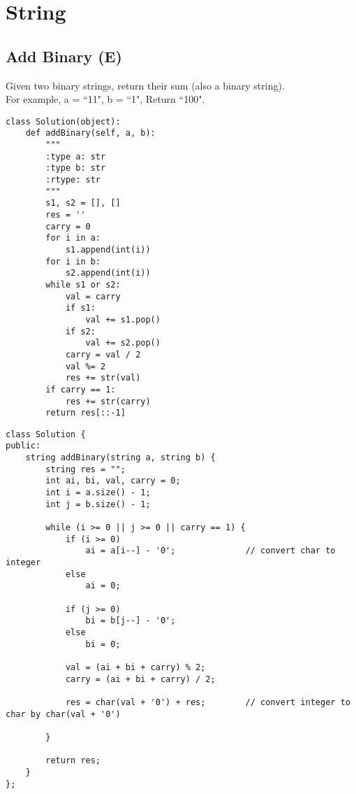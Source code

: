 \chapter{String}


\section{Add Binary (E)}
Given two binary strings, return their sum (also a binary string). \\

For example, a = ``11", b = ``1", Return ``100". \\ 

\begin{lstlisting}
class Solution(object):
    def addBinary(self, a, b):
        """
        :type a: str
        :type b: str
        :rtype: str
        """
        s1, s2 = [], []
        res = ''
        carry = 0
        for i in a:
            s1.append(int(i))
        for i in b:
            s2.append(int(i))
        while s1 or s2:
            val = carry
            if s1:
                val += s1.pop()
            if s2:
                val += s2.pop()
            carry = val / 2
            val %= 2
            res += str(val)         
        if carry == 1:
            res += str(carry)
        return res[::-1]
\end{lstlisting}

\begin{lstlisting}
class Solution {
public:
    string addBinary(string a, string b) {
        string res = "";
        int ai, bi, val, carry = 0;
        int i = a.size() - 1;
        int j = b.size() - 1;
        
        while (i >= 0 || j >= 0 || carry == 1) {
            if (i >= 0)
                ai = a[i--] - '0';              // convert char to integer
            else
                ai = 0;
                
            if (j >= 0)
                bi = b[j--] - '0';
            else
                bi = 0;
                
            val = (ai + bi + carry) % 2;
            carry = (ai + bi + carry) / 2;
            
            res = char(val + '0') + res;        // convert integer to char by char(val + '0') 
            
        }
        
        return res;
    }
};
\end{lstlisting}

